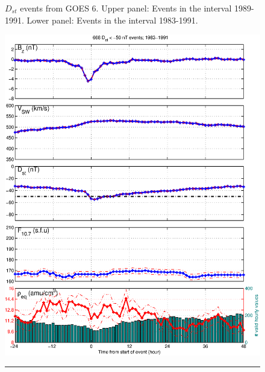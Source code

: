 \documentclass[10pt,twocolumn]{article}
\begin{document}
\begin{figure}[tp!]
\caption{$D_{st}$ events from GOES 6. Upper panel: Events in the interval 1989-1991. Lower panel: Events in the interval 1983-1991.}
\label{DailyAverages}
\end{figure}

\begin{figure}[tp!]
\centering
\includegraphics[scale=0.40]{paperfigures/stormavs-dst.eps}
\rule[1ex]{5cm}{1pt}

\end{figure}
\end{document}
